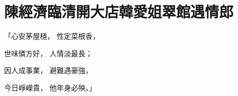 %

\chapter{陳經濟臨清開大店\KG 韓愛姐翠館遇情郎}


\begin{showcontents}{}




「心安茅屋穩，  性定菜根香，

世味憐方好，  人情淡最長；

因人成事業，  避難遇豪強，

今日崢嶸貴，  他年身必殃。」


\end{showcontents}
